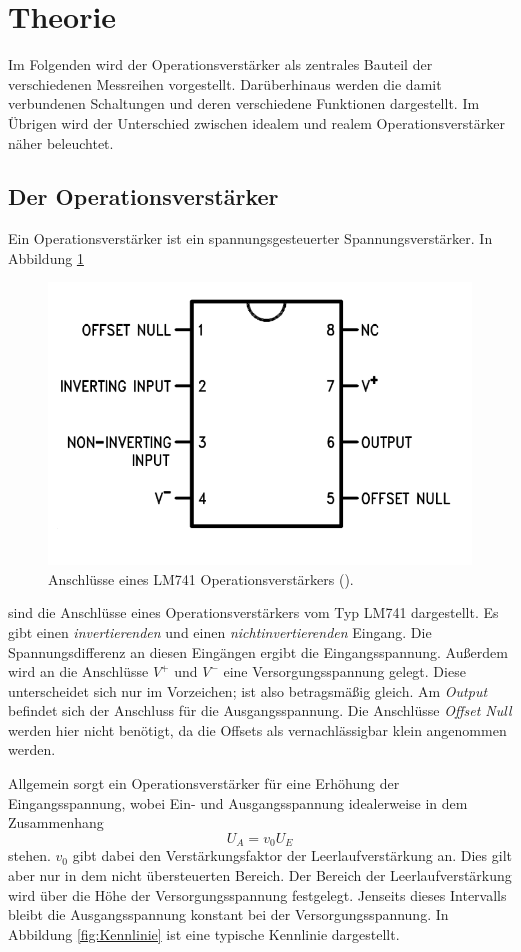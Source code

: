 \section{Theorie}
\label{sec:Theorie}


Im Folgenden wird der Operationsverstärker als zentrales Bauteil der verschiedenen Messreihen vorgestellt.
Darüberhinaus werden die damit verbundenen Schaltungen und deren verschiedene Funktionen dargestellt.
Im Übrigen wird der Unterschied zwischen idealem und realem Operationsverstärker näher beleuchtet.

\subsection{Der Operationsverstärker}

Ein Operationsverstärker ist ein spannungsgesteuerter Spannungsverstärker.
In Abbildung \ref{fig:OP}

\begin{figure}
    \centering 
    \includegraphics[width=.5\textwidth]{Bilder/OP.PNG}
    \caption{Anschlüsse eines LM741 Operationsverstärkers (\cite{LM741}).}
    \label{fig:OP}
\end{figure}

sind die Anschlüsse eines Operationsverstärkers vom Typ LM741 dargestellt.
Es gibt einen \textit{invertierenden} und einen \textit{nichtinvertierenden} Eingang.
Die Spannungsdifferenz an diesen Eingängen ergibt die Eingangsspannung.
Außerdem wird an die Anschlüsse $V^+$ und $V^-$ eine Versorgungsspannung gelegt.
Diese unterscheidet sich nur im Vorzeichen; ist also betragsmäßig gleich.
Am \textit{Output} befindet sich der Anschluss für die Ausgangsspannung.
Die Anschlüsse \textit{Offset Null} werden hier nicht benötigt, da die Offsets als vernachlässigbar klein angenommen werden.



Allgemein sorgt ein Operationsverstärker für eine Erhöhung der Eingangsspannung, wobei Ein- und Ausgangsspannung idealerweise in dem Zusammenhang
\begin{equation}
    U_A = v_0U_E 
\end{equation}
stehen.
$v_0$ gibt dabei den Verstärkungsfaktor der Leerlaufverstärkung an.
Dies gilt aber nur in dem nicht übersteuerten Bereich.
Der Bereich der Leerlaufverstärkung wird über die Höhe der Versorgungsspannung festgelegt.
Jenseits dieses Intervalls bleibt die Ausgangsspannung konstant bei der Versorgungsspannung.
In Abbildung \ref{fig:Kennlinie} ist eine typische Kennlinie dargestellt.

